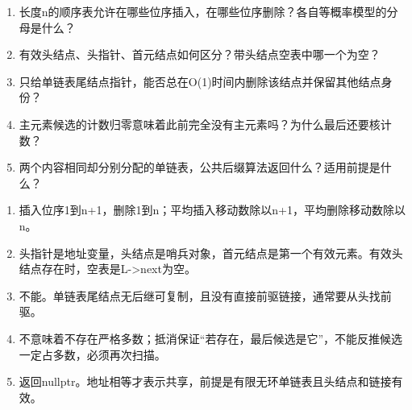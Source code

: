 \begin{recallcard}[从边界恢复算法]

\begin{enumerate}
\def\labelenumi{\arabic{enumi}.}
\setcounter{enumi}{3}
\tightlist
\item
  长度n的顺序表允许在哪些位序插入，在哪些位序删除？各自等概率模型的分母是什么？
\item
  有效头结点、头指针、首元结点如何区分？带头结点空表中哪一个为空？
\item
  只给单链表尾结点指针，能否总在O(1)时间内删除该结点并保留其他结点身份？
\item
  主元素候选的计数归零意味着此前完全没有主元素吗？为什么最后还要核计数？
\item
  两个内容相同却分别分配的单链表，公共后缀算法返回什么？适用前提是什么？
\end{enumerate}

\end{recallcard}

\begin{solution}[补充题核对答案]

\begin{enumerate}
\def\labelenumi{\arabic{enumi}.}
\setcounter{enumi}{3}
\tightlist
\item
  插入位序1到n+1，删除1到n；平均插入移动数除以n+1，平均删除移动数除以n。
\item
  头指针是地址变量，头结点是哨兵对象，首元结点是第一个有效元素。有效头结点存在时，空表是L-\textgreater next为空。
\item
  不能。单链表尾结点无后继可复制，且没有直接前驱链接，通常要从头找前驱。
\item
  不意味着不存在严格多数；抵消保证``若存在，最后候选是它''，不能反推候选一定占多数，必须再次扫描。
\item
  返回nullptr。地址相等才表示共享，前提是有限无环单链表且头结点和链接有效。
\end{enumerate}

\end{solution}
